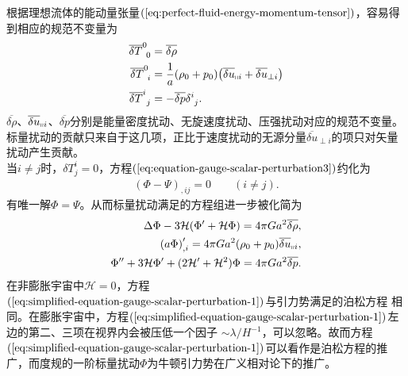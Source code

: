 根据理想流体的能动量张量$(\ref{eq:perfect-fluid-energy-momentum-tensor})$，容易得到相应的规范不变量为
\begin{align}
  \label{eq:perfect-fluid-gauge-invariant-variable}
  \overline{\delta{T}}^{0}_{\ 0} &= \overline{\delta{\rho}} \\
  \overline{\delta{T}}^{0}_{\ i} &=
  \frac{1}{a}(\rho_0+p_0){\left(\overline{\delta{u}}_{\shortparallel
        i}+\overline{\delta{u}}_{\perp i}\right)} \\
  \overline{\delta{T}}^{i}_{\ j}&= -\overline{\delta{p}}\delta^{i}_{\ j}.
\end{align}
$\overline{\delta{\rho}}$、$\overline{\delta{u}}_{\shortparallel
i}$、$\overline{\delta{p}}$分别是能量密度扰动、无旋速度扰动、压强扰动对应的规范不变量。
标量扰动的贡献只来自于这几项，正比于速度扰动的无源分量$\overline{\delta{u}}_{\perp
i}$的项只对矢量扰动产生贡献。\\
当$i\neq
j$时，$\delta{T}^{i}_{j}=0$，方程$(\ref{eq:equation-gauge-scalar-perturbation3})$约化为
\begin{align}
  {\left(\Phi-\Psi\right)}_{,ij}=0\qquad (i\neq j).
\end{align}
有唯一解$\Phi=\Psi$。从而标量扰动满足的方程组进一步被化简为
\begin{align}
  \Delta \Phi -3\mathcal{H}{\left(\Phi^\prime+\mathcal{H}\Phi\right)} =
  4\pi Ga^2\overline{\delta{\rho}},
  \label{eq:simplified-equation-gauge-scalar-perturbation-1} \\
  {\left(a\Phi\right)}^{\prime}_{,i}=4\pi
  Ga^2{\left(\rho_0+p_0\right)}\overline{\delta{u}}_{\shortparallel i},
  \label{eq:simplified-equation-gauge-scalar-perturbation-2} \\
  \Phi^{\prime\prime}+3\mathcal{H}\Phi^\prime+(2\mathcal{H}^{\prime}+\mathcal{H}^2)\Phi=
  4\pi Ga^2\overline{\delta{p}}.
  \label{eq:simplified-equation-gauge-scalar-perturbation-3}
\end{align}
在非膨胀宇宙中$\mathcal{H}=0$，方程$(\ref{eq:simplified-equation-gauge-scalar-perturbation-1})$与引力势满足的泊松方程
相同。在膨胀宇宙中，方程$(\ref{eq:simplified-equation-gauge-scalar-perturbation-1})$左边的第二、三项在视界内会被压低一个因子
$\sim\lambda
/H^{-1}$，可以忽略。故而方程$(\ref{eq:simplified-equation-gauge-scalar-perturbation-1})$可以看作是泊松方程的推广，而度规的一阶标量扰动$\Phi$为牛顿引力势在广义相对论下的推广。

